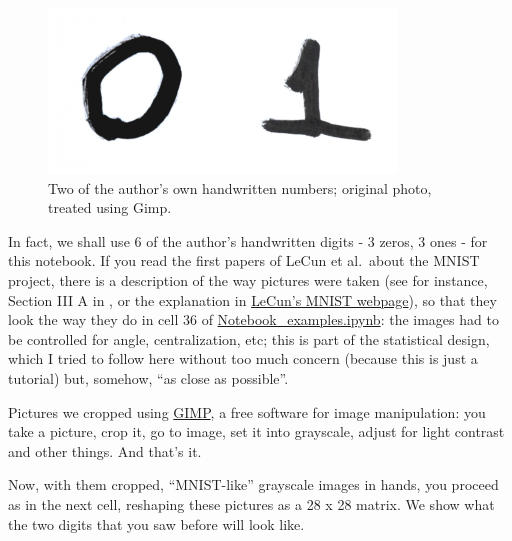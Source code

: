 \documentclass[openany,twoside]{book}
\begin{document}
\begin{figure}[htbp]
\centering
\includegraphics{figures/output_85_0.png}
\caption{Two of the author's own handwritten numbers; original photo, treated using Gimp.}
\end{figure}

In fact, we shall use 6 of the author's handwritten digits - 3 zeros, 3 ones - for this notebook. If you read the first papers of LeCun et al.~about the MNIST project, there is a description of the way pictures were taken (see for instance, Section III A in \citep{Mnist}, or the explanation in \href{http://yann.lecun.com/exdb/mnist/}{LeCun's MNIST webpage}), so that they look the way they do in cell 36 of \href{https://github.com/rafael-a-monteiro-math/Binary_classification_phase_separation/blob/master/Notebook_PSBC_examples.ipynb}{Notebook\_examples.ipynb}: the images had to be controlled for angle, centralization, etc; this is part of the statistical design, which I tried to follow here without too much concern (because this is just a tutorial) but, somehow, ``as close as possible''.

Pictures we cropped using \href{https://www.gimp.org}{GIMP}, a free software for image manipulation: you take a picture, crop it, go to image, set it into grayscale, adjust for light contrast and other things. And that's it.

Now, with them cropped, ``MNIST-like'' grayscale images in hands, you proceed as in the next cell, reshaping these pictures as a 28 x 28 matrix. We show what the two digits that you saw before will look like.
\end{document}

